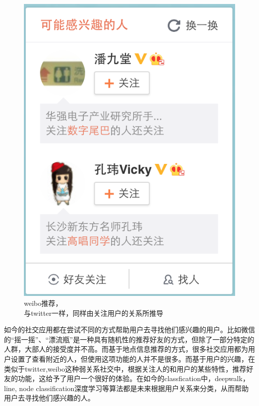 \begin{figure}[h]
\begin{minipage}[t]{0.45\linewidth}
\includegraphics[width=\textwidth]{img/chap1/weibo_recommend.png}
\caption{weibo推荐，\\与twitter一样，同样由关注用户的关系所推导\label{weibo推荐，}}
\end{minipage}

\end{figure}

如今的社交应用都在尝试不同的方式帮助用户去寻找他们感兴趣的用户。比如微信的“摇一摇”、“漂流瓶”是一种具有随机性的推荐好友的方式，但除了一部分特定的人群，大部人的接受度并不高。而基于地点信息推荐的方式，很多社交应用都为用户设置了查看附近的人，但使用这项功能的人并不是很多。而基于用户的兴趣，在类似于twitter,weibo这种弱关系社交中，根据关注人的和用户的某些特性，推荐好友的功能，这给予了用户一个很好的体验。在如今的classfication中，deepwalk\parencite{deepwalk}，line\parencite{node1}, node classification\parencite{node}深度学习\parencite{deep}等算法都是未来根据用户关系来分类，从而帮助用户去寻找他们感兴趣的人。


